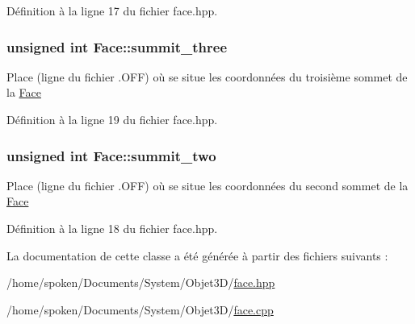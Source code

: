 Définition à la ligne 17 du fichier face.\-hpp.

\hypertarget{class_face_af322077aea999dd19dd169bd5bdd4bdf}{
\subsubsection[{summit\-\_\-three}]{\setlength{\rightskip}{0pt plus 5cm}unsigned int Face\-::summit\-\_\-three\hspace{0.3cm}{\ttfamily [private]}}}\label{class_face_af322077aea999dd19dd169bd5bdd4bdf}
Place (ligne du fichier .O\-F\-F) où se situe les coordonnées du troisième sommet de la \hyperlink{class_face}{Face} 

Définition à la ligne 19 du fichier face.\-hpp.

\hypertarget{class_face_a8d0b2a96bd53dcf7767c2cefe1fcc1f3}{
\subsubsection[{summit\-\_\-two}]{\setlength{\rightskip}{0pt plus 5cm}unsigned int Face\-::summit\-\_\-two\hspace{0.3cm}{\ttfamily [private]}}}\label{class_face_a8d0b2a96bd53dcf7767c2cefe1fcc1f3}
Place (ligne du fichier .O\-F\-F) où se situe les coordonnées du second sommet de la \hyperlink{class_face}{Face} 

Définition à la ligne 18 du fichier face.\-hpp.



La documentation de cette classe a été générée à partir des fichiers suivants \-:\begin{DoxyCompactItemize}
\item 
/home/spoken/\-Documents/\-System/\-Objet3\-D/\hyperlink{face_8hpp}{face.\-hpp}\item 
/home/spoken/\-Documents/\-System/\-Objet3\-D/\hyperlink{face_8cpp}{face.\-cpp}\end{DoxyCompactItemize}
